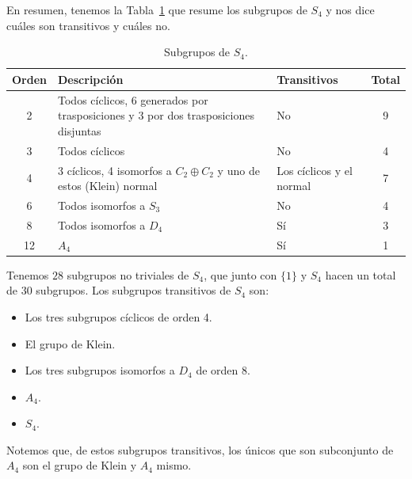 En resumen, tenemos la Tabla~\ref{tab:subgrupos_S4} que resume los subgrupos de $S_4$ y nos dice cuáles son transitivos y cuáles no.
\begin{table}[H]
\centering
\begin{tabular}{|c|p{7.5cm}|p{3.5cm}|c|}
    \hline
    Orden & Descripción & Transitivos & Total \\
    \hline
    2 & Todos cíclicos, 6 generados por trasposiciones y 3 por dos trasposiciones disjuntas & No & 9 \\
    \hline
    3 & Todos cíclicos & No & 4 \\
    \hline
    4 & 3 cíclicos, 4 isomorfos a $C_2\oplus C_2$ y uno de estos (Klein) normal & Los cíclicos y el normal & 7 \\
    \hline
    6 & Todos isomorfos a $S_3$ & No & 4 \\
    \hline
    8 & Todos isomorfos a $D_4$ & Sí & 3 \\
    \hline
    12 & $A_4$ & Sí & 1 \\
    \hline
\end{tabular}
\caption{Subgrupos de $S_4$.}
\label{tab:subgrupos_S4}
\end{table}

\noindent
Tenemos $28$ subgrupos no triviales de $S_4$, que junto con $\{1\}$ y $S_4$ hacen un total de $30$ subgrupos. Los subgrupos transitivos de $S_4$ son:
\begin{itemize}
    \item Los tres subgrupos cíclicos de orden 4.
    \item El grupo de Klein.
    \item Los tres subgrupos isomorfos a $D_4$ de orden 8.
    \item $A_4$.
    \item $S_4$.
\end{itemize}

Notemos que, de estos subgrupos transitivos, los únicos que son subconjunto de $A_4$ son el grupo de Klein y $A_4$ mismo.

